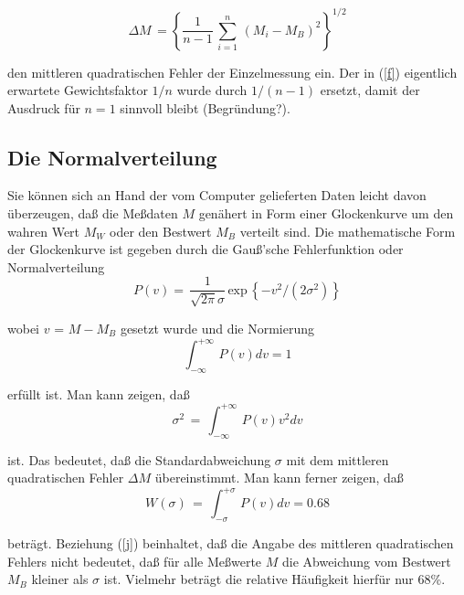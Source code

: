 \begin{equation} \label{f}
 \Delta M\,= \left\{\frac{1}{n-1}\,\sum_{i=1}^{n}\,(M_{i} -
 M_{B})^{2}\right\}^{1/2}
\end{equation}

den mittleren quadratischen Fehler der Einzelmessung ein. Der in
(\ref{f}) eigentlich erwartete Gewichtsfaktor $1/n$ wurde durch
$1/(n-1)$ ersetzt, damit der Ausdruck für $n=1$ sinnvoll bleibt
(Begründung?).


\subsection{Die Normalverteilung}

Sie können sich an Hand der vom Computer gelieferten Daten leicht davon
überzeugen, daß die Meßdaten $M$ genähert in Form einer Glockenkurve um
den wahren Wert $M_W$ oder den Bestwert $M_B$ verteilt sind. Die
mathematische Form der Glockenkurve ist gegeben durch die Gauß'sche
Fehlerfunktion oder Normalverteilung\\

\begin{equation} \label{g}
P(v)
=\,\frac{1}{\sqrt{2\pi}\sigma}\,\mbox{exp}\,\left\{-v^{2}/(2\sigma^{2})\right\}
\end{equation}

wobei $v$ = $M - M_B$ gesetzt wurde und die Normierung\\

\begin{equation} \label{h}
\int_{-\infty}^{+\infty}\,P(v)dv = 1
\end{equation}

erfüllt ist. Man kann zeigen, daß \\

\begin{equation} \label{i}
\sigma^{2}\,=\,\int_{-\infty}^{+\infty}\,P(v)v^{2}dv
\end{equation}

ist. Das bedeutet, daß die Standardabweichung $\sigma$ mit dem
mittleren quadratischen Fehler $\Delta M$ übereinstimmt. Man kann
ferner zeigen, daß \\

\begin{equation} \label{j}
 W(\sigma)\,=\,\int_{-\sigma}^{+\sigma}\,P(v)dv = 0.68
\end{equation}

beträgt. Beziehung (\ref{j}) beinhaltet, daß die Angabe des mittleren
quadratischen Fehlers nicht bedeutet, daß für alle Meßwerte $M$ die
Abweichung vom Bestwert $M_B$ kleiner als $\sigma$ ist. Vielmehr
beträgt die relative Häufigkeit hierfür nur 68\%.\\

